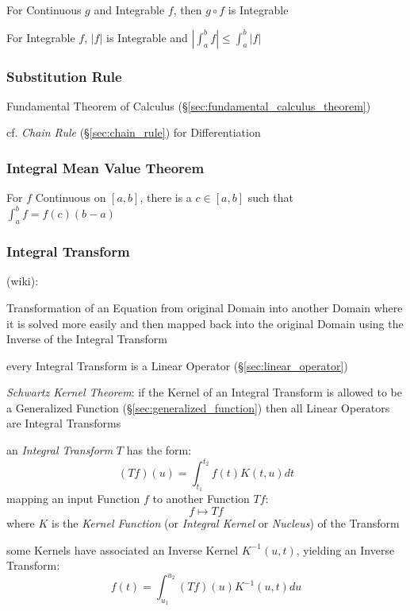 For Continuous $g$ and Integrable $f$, then $g \circ f$ is Integrable

For Integrable $f$, $|f|$ is Integrable and $|\int_a^b f| \leq
\int_a^b |f|$



\subsubsection{Substitution Rule}\label{sec:substitution_rule}

Fundamental Theorem of Calculus (\S\ref{sec:fundamental_calculus_theorem})

\fist cf. \emph{Chain Rule} (\S\ref{sec:chain_rule}) for Differentiation



\subsubsection{Integral Mean Value Theorem}
\label{sec:integral_mean_value}

For $f$ Continuous on $[a,b]$, there is a $c \in [a,b]$ such that
$\int_a^b f = f(c)(b - a)$



\subsubsection{Integral Transform}\label{sec:integral_transform}

(wiki):

Transformation of an Equation from original Domain into another Domain where it
is solved more easily and then mapped back into the original Domain using the
Inverse of the Integral Transform

every Integral Transform is a Linear Operator (\S\ref{sec:linear_operator})

\emph{Schwartz Kernel Theorem}: if the Kernel of an Integral Transform is
allowed to be a Generalized Function (\S\ref{sec:generalized_function}) then
all Linear Operators are Integral Transforms

an \emph{Integral Transform} $T$ has the form:
\[
  (T f)(u) = \int_{t_1}^{t_2} f(t) K(t,u) dt
\]
mapping an input Function $f$ to another Function $T f$:
\[
  f \mapsto T f
\]
where $K$ is the \emph{Kernel Function} (or \emph{Integral Kernel} or
\emph{Nucleus}) of the Transform

some Kernels have associated an Inverse Kernel $K^{-1}(u,t)$, yielding an
Inverse Transform:
\[
  f(t) = \int_{u_1}^{u_2} (T f)(u) K^{-1}(u,t) du
\]

